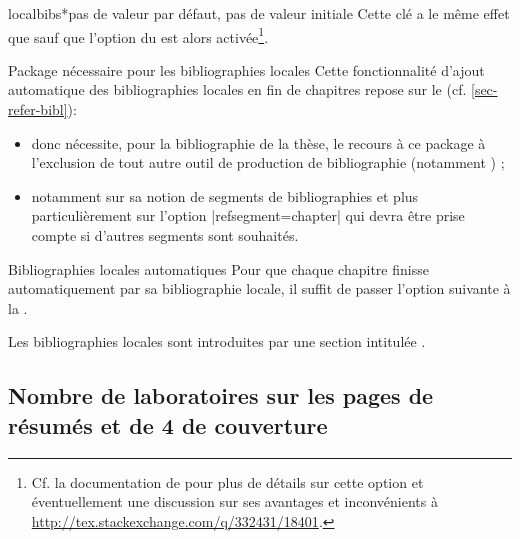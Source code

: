 \begin{docKey}[][doc new=2016-10-16]{localbibs*}{}{pas de valeur par défaut, pas
    de valeur initiale} 
  Cette clé a le même effet que  sauf que l'option
   du  est alors
  activée\footnote{Cf. la documentation de  pour plus de
    détails sur cette option et éventuellement une discussion sur ses avantages
    et inconvénients à \url{http://tex.stackexchange.com/q/332431/18401}.}.
\end{docKey}

\begin{dbwarning}{Package  nécessaire pour les bibliographies
    locales}{}
  Cette fonctionnalité d'ajout automatique des bibliographies locales en fin de
  chapitres repose sur le  (cf. \vref{sec-refer-bibl}):
  \begin{itemize}
  \item donc nécessite, pour la bibliographie de la thèse, le recours à ce
    package \alert{à l'exclusion de tout autre outil de production de
      bibliographie} (notamment ) ;
  \item notamment sur sa notion de segments de bibliographies et plus
    particulièrement sur l'option |refsegment=chapter| qui devra être prise
    compte si d'autres segments sont souhaités.
  \end{itemize}
\end{dbwarning}

\begin{dbexample}{Bibliographies locales automatiques}{}
  Pour que chaque chapitre finisse automatiquement par sa bibliographie locale,
  il suffit de passer l'option suivante à la \yatCl{}.
\end{dbexample}

Les bibliographies locales sont introduites par une section intitulée
.

\subsection{Nombre de laboratoires sur les pages de résumés et de 4\ieme{} de couverture}
\label{sec-nombre-de-labor}
%
%


